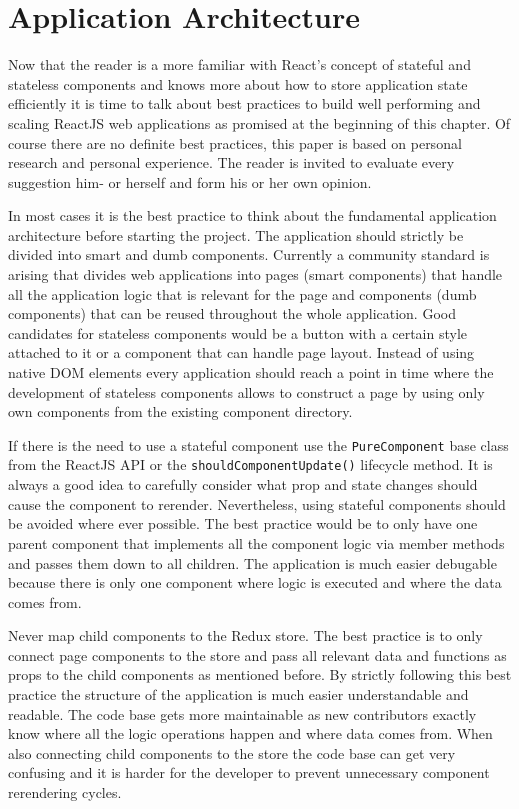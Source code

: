 
\section{Application Architecture} \label{sec:application-architecture}

Now that the reader is a more familiar with React's concept of stateful and stateless components and knows more about how to store application state efficiently it is time to talk about best practices to build well performing and scaling ReactJS web applications as promised at the beginning of this chapter. Of course there are no definite best practices, this paper is based on personal research and personal experience. The reader is invited to evaluate every suggestion him- or herself and form his or her own opinion.

In most cases it is the best practice to think about the fundamental application architecture before starting the project. The application should strictly be divided into smart and dumb components. Currently a community standard is arising that divides web applications into pages (smart components) that handle all the application logic that is relevant for the page and components (dumb components) that can be reused throughout the whole application. Good candidates for stateless components would be a button with a certain style attached to it or a component that can handle page layout. Instead of using native DOM elements every application should reach a point in time where the development of stateless components allows to construct a page by using only own components from the existing component directory.

If there is the need to use a stateful component use the \texttt{PureComponent} base class from the ReactJS API or the \texttt{shouldComponentUpdate()} lifecycle method. It is always a good idea to carefully consider what prop and state changes should cause the component to rerender. Nevertheless, using stateful components should be avoided where ever possible. The best practice would be to only have one parent component that implements all the component logic via member methods and passes them down to all children. The application is much easier debugable because there is only one component where logic is executed and where the data comes from.

Never map child components to the Redux store. The best practice is to only connect page components to the store and pass all relevant data and functions as props to the child components as mentioned before. By strictly following this best practice the structure of the application is much easier understandable and readable. The code base gets more maintainable as new contributors exactly know where all the logic operations happen and where data comes from. When also connecting child components to the store the code base can get very confusing and it is harder for the developer to prevent unnecessary component rerendering cycles.

